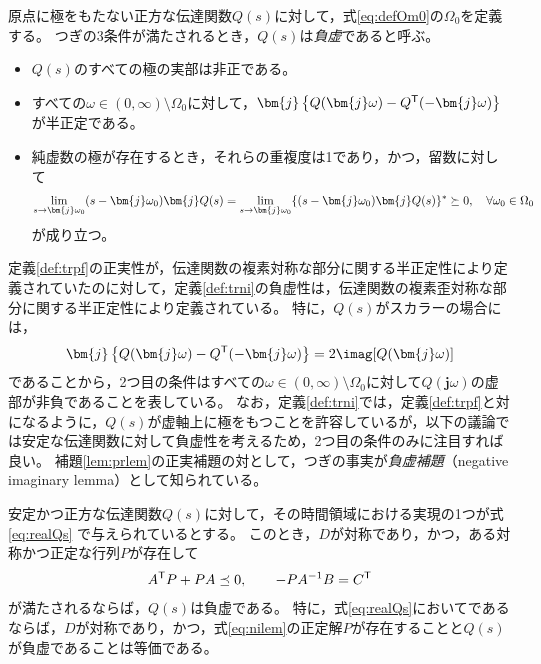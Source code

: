 \documentclass[tombow,dvipdfmx]{corona-a5}
\begin{document}
\begin{定義}[伝達関数の負虚性]
\label{def:trni}
原点に極をもたない正方な伝達関数$Q(s)$に対して，式\ref{eq:defOm0}の$\Omega_0$を定義する。
つぎの3条件が満たされるとき，$Q(s)$は\emph{負虚}であると呼ぶ。
\begin{itemize}
\item $Q(s)$のすべての極の実部は非正である。
\item すべての$\omega \in (0,\infty)\setminus \Omega_0$に対して，$\bm{j}\left\{Q(\bm{j} \omega) - Q^{\sf T}(-\bm{j} \omega) \right\}$が半正定である。
\item 純虚数の極が存在するとき，それらの重複度は1であり，かつ，留数に対して
\begin{align*}
\lim_{s \rightarrow \bm{j} \omega_0} (s-\bm{j} \omega_0) \bm{j} Q(s) = 
\lim_{s\rightarrow \bm{j} \omega_0} \{ (s-\bm{j} \omega_0) \bm{j} Q(s)\}^{\sf *}\succeq 0
,\quad
\forall \omega_0 \in \Omega_0
\end{align*}
が成り立つ。
\end{itemize}
\end{定義}

定義\ref{def:trpf}の正実性が，伝達関数の複素対称な部分に関する半正定性により定義されていたのに対して，定義\ref{def:trni}の負虚性は，伝達関数の複素歪対称な部分に関する半正定性により定義されている。
特に，$Q(s)$がスカラーの場合には，
\begin{align*}
\bm{j}\left\{Q(\bm{j} \omega) - Q^{\sf T}(-\bm{j} \omega) \right\}
= 2 \imag[Q(\bm{j} \omega)]
\end{align*}
であることから，2つ目の条件はすべての$\omega \in (0,\infty)\setminus \Omega_0$に対して$Q(\bm{j}\omega)$の虚部が非負であることを表している。
なお，定義\ref{def:trni}では，定義\ref{def:trpf}と対になるように，$Q(s)$が虚軸上に極をもつことを許容しているが，以下の議論では安定な伝達関数に対して負虚性を考えるため，2つ目の条件のみに注目すれば良い。
補題\ref{lem:prlem}の正実補題の対として，つぎの事実が\emph{負虚補題}（negative imaginary lemma）として知られている。

\begin{補題}[負虚補題]
\label{lem:nilem}
安定かつ正方な伝達関数$Q(s)$に対して，その時間領域における実現の1つが式\ref{eq:realQs}
で与えられているとする。
このとき，$D$が対称であり，かつ，ある対称かつ正定な行列$P$が存在して
\begin{align}\label{eq:nilem}
A^{\sf T}P+PA \preceq 0
,\qquad
-PA^{-1}B = C^{\sf T}
\end{align}
が満たされるならば，$Q(s)$は負虚である。
特に，式\ref{eq:realQs}においてであるならば，$D$が対称であり，かつ，式\ref{eq:nilem}の正定解$P$が存在することと$Q(s)$が負虚であることは等価である。
\end{補題}
\end{document}
